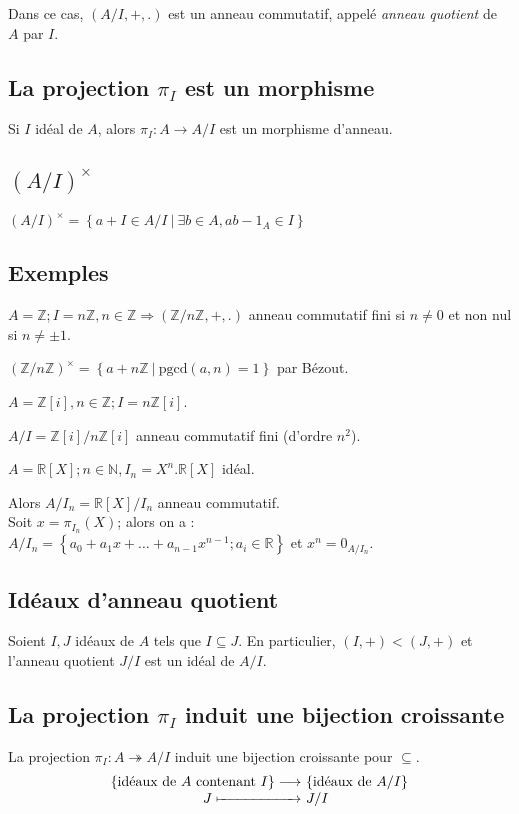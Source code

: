 \documentclass[reqno,a4paper,10pt]{report}
\makeatletter
\newcommand{\set}[1]{\left\lbrace #1 \right\rbrace} %
\newcommand{\IZ}{\ensuremath{\mathbb{Z}}\xspace} %
\newcommand{\IR}{\ensuremath{\mathbb{R}}\xspace} %
\newcommand{\IN}{\ensuremath{\mathbb{N}}\xspace} %
\newcommand{\so}{\Rightarrow}
\newcommand{\surj}{\twoheadrightarrow}
\newcommand{\pgcd}{\mathrm{pgcd}} %
\newcommand{\Such}{\ \Big| \ }
\newcommand{\such}{\ | \ }
\let\olditemize=\itemize%
\renewenvironment{itemize}{%
    \olditemize%
  }{%
    \@noparlisttrue%
    \endlist%
  }%
\makeatother
\begin{document}
Dans ce cas, $(A/I, +, .)$ est un anneau commutatif, appelé \emph{anneau
quotient} de $A$ par $I$.


\subsection{La projection $\pi_I$ est un morphisme}
Si $I$ idéal de $A$, alors $\pi_I: A \to A/I$ est un morphisme d'anneau.

\subsection{$(A/I)^\times$}
$(A/I)^\times = \set{a + I \in A/I \Such \exists b \in A, ab - 1_A \in I}$

\subsection{Exemples}
\begin{itemize}
  \item $A=\IZ; I=n\IZ, n \in \IZ \so (\IZ/n\IZ, +, .)$ anneau commutatif fini
    si $n\neq 0$ et non nul si $n\neq \pm 1$.
  
    $(\IZ/n\IZ)^\times = \set{a+n\IZ \such \pgcd(a,n)=1}$ par Bézout.

  \item $A=\IZ[i], n \in \IZ; I=n\IZ[i]$.

    $A/I=\IZ[i]/n\IZ[i]$ anneau commutatif fini (d'ordre $n^2$).

  \item $A=\IR[X]; n \in \IN, I_n=X^n.\IR[X]$ idéal.

    Alors $A/I_n=\IR[X]/I_n$ anneau commutatif.\\
    Soit $x=\pi_{I_n}(X)$; alors on a :\\
    $A/I_n=\set{a_0+a_1 x + \dots + a_{n-1} x^{n-1}; a_i \in \IR}$ et $x^n =
    0_{A/I_n}$.
\end{itemize}

\subsection{Idéaux d'anneau quotient}
Soient $I,J$ idéaux de $A$ tels que $I\subseteq J$. En particulier, $(I,+) <
(J,+)$ et l'anneau quotient $J/I$ est un idéal de $A/I$.

\subsection{La projection $\pi_I$ induit une bijection croissante}
La projection $\pi_I : A \surj A/I$ induit une bijection croissante pour
$\subseteq$.
\[
\begin{array}[t]{r@{\ }l}
  \set{\text{idéaux de }A\text{ contenant } I} \longrightarrow&
  \set{\text{idéaux de }A/I}\\
  J \xmapsto{\hphantom{\textstyle \text{ contenant } I}}& J/I
\end{array}
\]
\end{document}
